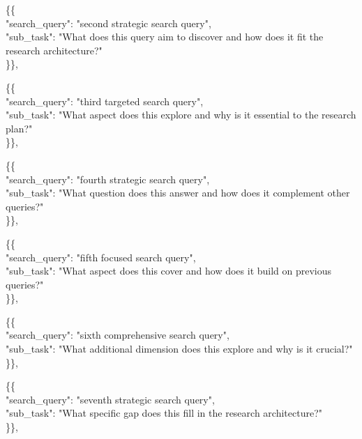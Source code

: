 \documentclass{article} %
\newcommand{\tab}{\hspace*{2em}}
\begin{document}
\begin{examplebox}
\tab \tab 
\{\{ \\
\tab \tab \tab "search\_query": "second strategic search query",\\
\tab \tab \tab "sub\_task": "What does this query aim to discover and how does it fit the research \tab architecture?"\\
\tab \tab \}\},

\tab \tab
\{\{ \\
\tab \tab \tab "search\_query": "third targeted search query",\\
\tab \tab \tab "sub\_task": "What aspect does this explore and why is it essential to the research plan?"\\
\tab \tab \}\},

\tab \tab
\{\{ \\
\tab \tab \tab "search\_query": "fourth strategic search query",\\
\tab \tab \tab "sub\_task": "What question does this answer and how does it complement other queries?"\\
\tab \tab \}\},

\tab \tab
\{\{ \\
\tab \tab \tab "search\_query": "fifth focused search query",\\
\tab \tab \tab "sub\_task": "What aspect does this cover and how does it build on previous queries?"\\
\tab \tab \}\},

\tab \tab
\{\{ \\
\tab \tab \tab "search\_query": "sixth comprehensive search query",\\
\tab \tab \tab "sub\_task": "What additional dimension does this explore and why is it crucial?"\\
\tab \tab \}\},

\tab \tab
\{\{ \\
\tab \tab \tab "search\_query": "seventh strategic search query",\\
\tab \tab \tab "sub\_task": "What specific gap does this fill in the research architecture?"\\
\tab \tab \}\},


\end{examplebox}
\end{document}
